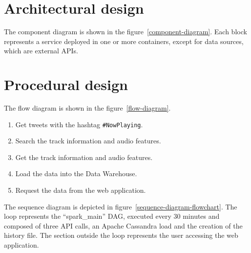 \section{Architectural design}
\nonzeroparskip The component diagram is shown in the figure~\ref{component-diagram}. Each block represents a service deployed in one or more containers, except for data sources, which are external APIs.


\section{Procedural design}
\nonzeroparskip The flow diagram is shown in the figure~\ref{flow-diagram}.
\begin{enumerate}
	\item Get tweets with the hashtag \texttt{\#NowPlaying}.
	\item Search the track information and audio features.
	\item Get the track information and audio features.
	\item Load the data into the Data Warehouse.
	\item Request the data from the web application.
\end{enumerate}


\nonzeroparskip The sequence diagram is depicted in figure~\ref{sequence-diagram-flowchart}. The loop represents the ``spark\_main'' DAG, executed every 30 minutes and composed of three API calls, an Apache Cassandra load and the creation of the history file. The section outside the loop represents the user accessing the web application.

